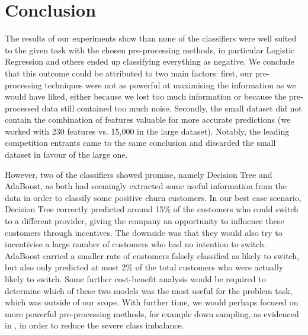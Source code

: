 \documentclass{article}
\begin{document}
\section{Conclusion}

The results of our experiments show than none of the classifiers were well suited to the given task with the chosen pre-processing methods, in particular Logistic Regression and others ended up classifying everything as negative.
We conclude that this outcome could be attributed to two main factors:
first, our pre-processing techniques were not as powerful at maximising the information as we would have liked, 
either because we lost too much information or because the pre-processed data still contained too much noise.
Secondly, the small dataset did not contain the combination of features valuable for more accurate predictions (we worked with 230 features vs. 15,000 in the large dataset).
Notably, the leading competition entrants came to the same conclusion and discarded the small dataset in favour of the large one.\cite{guyon2009analysis}

However, two of the classifiers showed promise, namely Decision Tree and AdaBoost, as both had seemingly extracted some useful information from the data in order to classify some positive churn customers.
In our best case scenario, Decision Tree correctly predicted around 15\% of the customers who could switch to a different provider, giving the company an opportunity to influence these customers through incentives.
The downside was that they would also try to incentivise a large number of customers who had no intention to switch.
AdaBoost carried a smaller rate of customers falsely classified as likely to switch, but also only predicted at most 2\% of the total customers who were actually likely to switch.
Some further cost-benefit analysis would be required to determine which of these two models was the most useful for the problem task, which was outside of our scope.
With further time, we would perhaps focused on more powerful pre-processing methods, for example down sampling, as evidenced in \cite{domingos1999metacost}, in order to reduce the severe class imbalance.

\end{document}
